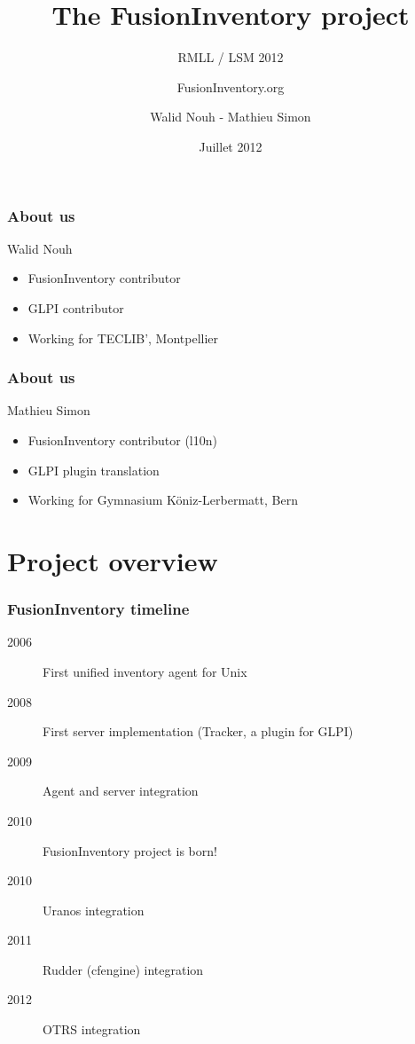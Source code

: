 \documentclass{beamer}
\title{The FusionInventory project}
\author{{FusionInventory.org}}
\date{Juillet 2012}
\institute{\texttt{[image: ./pics/rmll2011.jpg]}}
\subtitle{RMLL / LSM 2012}
\institute{Genève}
\author{ Walid Nouh - Mathieu Simon}
\begin{document}
\frame[plain]{\titlepage}


\begin{frame}
    \frametitle{About us}


    \begin{block}{Walid Nouh}
        \begin{itemize}
        \item FusionInventory contributor
        \item GLPI contributor  
        \item Working for TECLIB', Montpellier
        \end{itemize}
    \end{block}

\end{frame}

\begin{frame}
    \frametitle{About us}


    \begin{block}{Mathieu Simon}
        \begin{itemize}
        \item FusionInventory contributor (l10n)
        \item GLPI plugin translation
        \item Working for Gymnasium Köniz-Lerbermatt, Bern
        \end{itemize}
    \end{block}

\end{frame}

\section{Project overview}

\begin{frame}
    \frametitle{FusionInventory timeline}

    \begin{description}
      \item[2006] First unified inventory agent for Unix
      \item[2008] First server implementation (Tracker, a plugin for GLPI)
      \item[2009] Agent and server integration
      \item[2010] FusionInventory project is born! 
      \item[2010] Uranos integration
      \item[2011] Rudder (cfengine) integration
      \item[2012] OTRS integration
    \end{description}

\end{frame}
\end{document}
